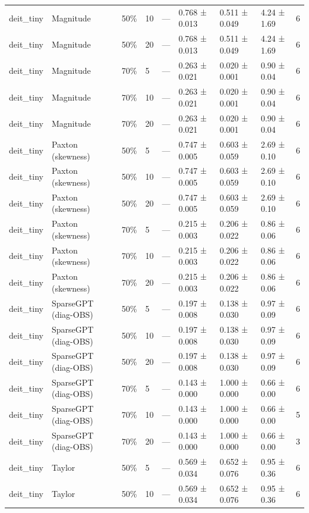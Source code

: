 \begin{table}[t]
\begin{tabular}{lllllllll}
deit\_tiny & Magnitude & 50\% & 10 & — & 0.768 ± 0.013 & 0.511 ± 0.049 & 4.24 ± 1.69 & 6 \\
deit\_tiny & Magnitude & 50\% & 20 & — & 0.768 ± 0.013 & 0.511 ± 0.049 & 4.24 ± 1.69 & 6 \\
deit\_tiny & Magnitude & 70\% & 5 & — & 0.263 ± 0.021 & 0.020 ± 0.001 & 0.90 ± 0.04 & 6 \\
deit\_tiny & Magnitude & 70\% & 10 & — & 0.263 ± 0.021 & 0.020 ± 0.001 & 0.90 ± 0.04 & 6 \\
deit\_tiny & Magnitude & 70\% & 20 & — & 0.263 ± 0.021 & 0.020 ± 0.001 & 0.90 ± 0.04 & 6 \\
deit\_tiny & Paxton (skewness) & 50\% & 5 & — & 0.747 ± 0.005 & 0.603 ± 0.059 & 2.69 ± 0.10 & 6 \\
deit\_tiny & Paxton (skewness) & 50\% & 10 & — & 0.747 ± 0.005 & 0.603 ± 0.059 & 2.69 ± 0.10 & 6 \\
deit\_tiny & Paxton (skewness) & 50\% & 20 & — & 0.747 ± 0.005 & 0.603 ± 0.059 & 2.69 ± 0.10 & 6 \\
deit\_tiny & Paxton (skewness) & 70\% & 5 & — & 0.215 ± 0.003 & 0.206 ± 0.022 & 0.86 ± 0.06 & 6 \\
deit\_tiny & Paxton (skewness) & 70\% & 10 & — & 0.215 ± 0.003 & 0.206 ± 0.022 & 0.86 ± 0.06 & 6 \\
deit\_tiny & Paxton (skewness) & 70\% & 20 & — & 0.215 ± 0.003 & 0.206 ± 0.022 & 0.86 ± 0.06 & 6 \\
deit\_tiny & SparseGPT (diag-OBS) & 50\% & 5 & — & 0.197 ± 0.008 & 0.138 ± 0.030 & 0.97 ± 0.09 & 6 \\
deit\_tiny & SparseGPT (diag-OBS) & 50\% & 10 & — & 0.197 ± 0.008 & 0.138 ± 0.030 & 0.97 ± 0.09 & 6 \\
deit\_tiny & SparseGPT (diag-OBS) & 50\% & 20 & — & 0.197 ± 0.008 & 0.138 ± 0.030 & 0.97 ± 0.09 & 6 \\
deit\_tiny & SparseGPT (diag-OBS) & 70\% & 5 & — & 0.143 ± 0.000 & 1.000 ± 0.000 & 0.66 ± 0.00 & 6 \\
deit\_tiny & SparseGPT (diag-OBS) & 70\% & 10 & — & 0.143 ± 0.000 & 1.000 ± 0.000 & 0.66 ± 0.00 & 5 \\
deit\_tiny & SparseGPT (diag-OBS) & 70\% & 20 & — & 0.143 ± 0.000 & 1.000 ± 0.000 & 0.66 ± 0.00 & 3 \\
deit\_tiny & Taylor & 50\% & 5 & — & 0.569 ± 0.034 & 0.652 ± 0.076 & 0.95 ± 0.36 & 6 \\
deit\_tiny & Taylor & 50\% & 10 & — & 0.569 ± 0.034 & 0.652 ± 0.076 & 0.95 ± 0.36 & 6 \\

\end{tabular}
\end{table}
